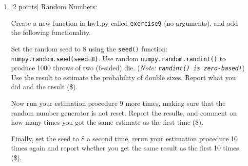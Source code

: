 \documentclass[10pt]{article}
\begin{document}
\begin{enumerate}
{\bf You must always document your code!}  Documenting your code is {\color{red} required} for this class -- you will loose points if you do not document your code.  Python in-line comments can be added using the \# character -- anything following will be ignored by python.  Python also uses a special idiom for documenting functions: Right after function signature line add documentation within a triple-quote body, e.g.,:
\begin{verbatim}
def scale01(arr):
    """
    Linearly scale the values of an array in the range [0,1]
    :param a: input ndarray
    :return: scaled ndarray
    """
    <function_body>...
\end{verbatim}
Beyond making your source code easier to understand and maintain, you also get the benefit of making documentation available within the python console, once functions are defined within the python instance.  For example, once I've executed the above function definition within the python console, I can execute {\tt help(scale01)} as follows:
\begin{verbatim}
>>> help(scale01)
Help on function scale01:

scale01(arr)
    Linearly scale the values of an array in the range [0,1]
    :param arr: input ndarray
    :return: scaled ndarray
\end{verbatim}

Document your code (with inline comments) and provide function docstrings for each function you write in this homework (\$).

Done throughout 


\item \label{prob:9} [2 points]
Random Numbers:

Create a new function in hw1.py called {\tt exercise9} (no arguments), and add the following functionality.

Set the random seed to 8 using the {\tt seed()} function: {\tt numpy.random.seed(seed=8)}.  Use random {\tt numpy.random.randint()} to produce 1000 throws of two (6-sided) die.  ({\em Note: {\tt randint() is zero-based!}})  Use the result to estimate the probability of double sixes.  Report what you did and the result (\$).  

Now run your estimation procedure 9 more times, making sure that the random number generator is not reset.  Report the results, and comment on how many times you got the same estimate as the first time (\$).

Finally, set the seed to 8 a second time, rerun your estimation procedure 10 times again and report whether you get the same result as the first 10 times (\$).


\end{enumerate}
\end{document}
